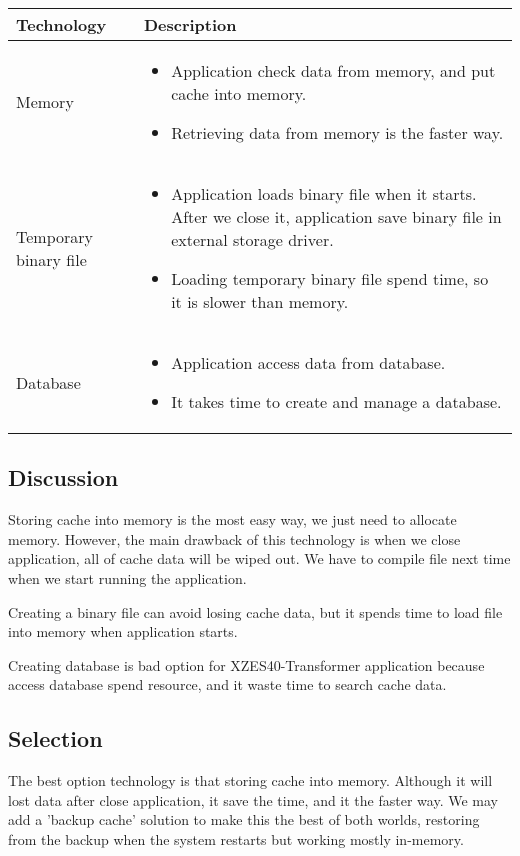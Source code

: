 \begin{center}
    \begin{tabular}{ | l | p{10cm} |}
    \hline
    Technology & Description  \\ \hline
    Memory&
    \begin{itemize}
      \item Application check data from memory, and put cache into memory.
      \item Retrieving data from memory is the faster way.
    \end{itemize}\\ \hline
    Temporary binary file&
    \begin{itemize}
      \item Application loads binary file when it starts. After we close it, application save binary file in external storage driver.
      \item Loading temporary binary file spend time, so it is slower than memory.
    \end{itemize}\\ \hline
    Database &
    \begin{itemize}
      \item Application access data from database.
      \item It takes time to create and manage a database.
    \end{itemize}\\ \hline
    \end{tabular}
\end{center}

\subsection{Discussion}

Storing cache into memory is the most easy way, we just need to allocate memory.
However, the main drawback of this technology is when we close application, all of cache data will be wiped out.
We have to compile file next time when we start running the application.

Creating a binary file can avoid losing cache data, but it spends time to load file into memory when application starts.

Creating database is bad option for XZES40-Transformer application because access database spend resource, and it waste time to search cache data.

\subsection{Selection}

The best option technology is that storing cache into memory.
Although it will lost data after close application, it save the time, and it the faster way.
We may add a 'backup cache' solution to make this the best of both worlds, restoring from the backup when the system restarts but working mostly in-memory.
